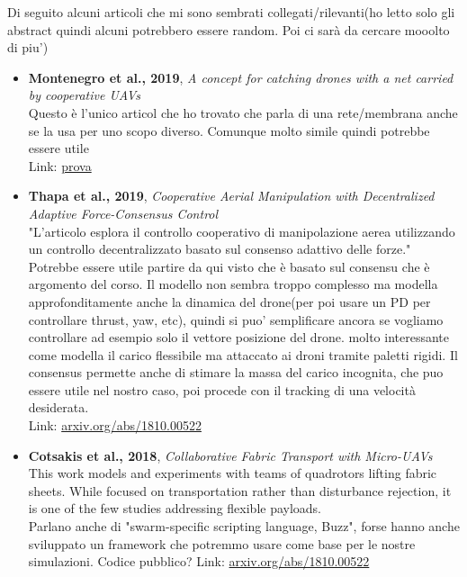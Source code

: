 \documentclass[11pt]{article}
\begin{document}
\vspace{-0.2cm}
Di seguito alcuni articoli che mi sono sembrati collegati/rilevanti(ho letto solo gli abstract quindi alcuni potrebbero essere random. Poi ci sarà da cercare mooolto di piu')
\begin{itemize}
     \item \textbf{Montenegro et al., 2019}, \emph{A concept for catching drones with a net carried by cooperative UAVs} \\
   Questo è l'unico articol che ho trovato che parla di una rete/membrana anche se la usa per uno scopo diverso. Comunque molto simile quindi potrebbe essere utile\\
    Link: \href{https://www.researchgate.net/publication/336088594_A_concept_for_catching_drones_with_a_net_carried_by_cooperative_UAVs}{prova}
    
     \item \textbf{Thapa et al., 2019}, \emph{Cooperative Aerial Manipulation with Decentralized Adaptive Force-Consensus Control} \\
    "L’articolo esplora il controllo cooperativo di manipolazione aerea utilizzando un controllo decentralizzato basato sul consenso adattivo delle forze." Potrebbe essere utile partire da qui visto che è basato sul consensu che è argomento del corso. Il modello non sembra troppo complesso ma modella approfonditamente anche la dinamica del drone(per poi usare un PD per controllare thrust, yaw, etc), quindi si puo' semplificare ancora se vogliamo controllare ad esempio solo il vettore posizione del drone.  molto interessante come modella il carico flessibile ma attaccato ai droni tramite paletti rigidi. Il consensus permette anche di stimare la massa del carico incognita, che puo essere utile nel nostro caso, poi procede con il tracking di una velocità desiderata.\\
    Link: \href{https://link.springer.com/article/10.1007/s10846-019-01048-4?utm_source=chatgpt.com}{arxiv.org/abs/1810.00522}
    
     \item \textbf{Cotsakis et al., 2018}, \emph{Collaborative Fabric Transport with Micro-UAVs} \\
    This work models and experiments with teams of quadrotors lifting fabric sheets. While focused on transportation rather than disturbance rejection, it is one of the few studies addressing flexible payloads. \\ Parlano anche di "swarm-specific scripting language, Buzz", forse hanno anche sviluppato un framework che potremmo usare come base per le nostre simulazioni. Codice pubblico?
    Link: \href{https://arxiv.org/abs/1810.00522}{arxiv.org/abs/1810.00522}
    

\end{itemize}
\end{document}
